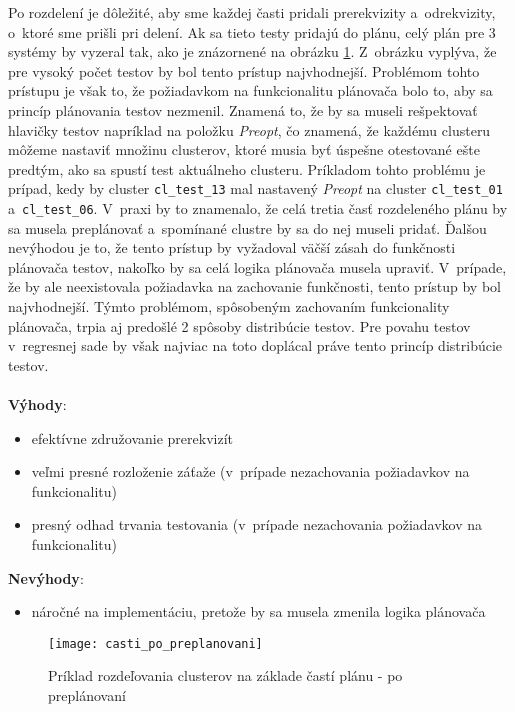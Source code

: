 Po rozdelení je dôležité, aby sme každej časti pridali prerekvizity 
a~odrekvizity, o~ktoré sme prišli pri delení. Ak sa tieto testy pridajú 
do plánu, celý plán pre 3 systémy by vyzeral tak, ako je znázornené na 
obrázku \ref{obrazok:distribucia_casti_po_preplanovani}.
Z~obrázku vyplýva, že pre vysoký počet testov by bol tento prístup 
najvhodnejší. Problémom tohto prístupu je však to, že požiadavkom na 
funkcionalitu plánovača bolo to, aby sa princíp plánovania testov nezmenil. 
Znamená to, že by sa museli rešpektovať hlavičky testov napríklad na 
položku \emph{Preopt}, čo znamená, že každému clusteru môžeme nastaviť 
množinu clusterov, ktoré musia byť úspešne otestované ešte predtým, 
ako sa spustí test aktuálneho clusteru.
Príkladom tohto problému je prípad, kedy by cluster \texttt{cl\_test\_13} 
mal nastavený \textit{Preopt} na cluster \texttt{cl\_test\_01} 
a~\texttt{cl\_test\_06}.
V~praxi by to znamenalo, že celá tretia časť rozdeleného plánu by sa 
musela preplánovať a~spomínané clustre by sa do nej museli pridať. 
Ďalšou nevýhodou je to, že tento prístup by vyžadoval väčší zásah do 
funkčnosti plánovača testov, nakoľko by sa celá logika plánovača musela upraviť.
V~prípade, že by ale neexistovala požiadavka na zachovanie funkčnosti, 
tento prístup by bol najvhodnejší. Týmto problémom, spôsobeným zachovaním 
funkcionality plánovača, trpia aj predošlé 2 spôsoby distribúcie testov. 
Pre povahu testov v~regresnej sade by však najviac na toto doplácal 
práve tento princíp distribúcie testov.  
\\
\\
\noindent \textbf{Výhody}:
\begin{itemize}
\item efektívne združovanie prerekvizít
\item veľmi presné rozloženie záťaže 
(v~prípade nezachovania požiadavkov na funkcionalitu)
\item presný odhad trvania testovania 
(v~prípade nezachovania požiadavkov na funkcionalitu)
\end{itemize} 

\noindent \textbf{Nevýhody}:
\begin{itemize}
\item náročné na implementáciu, pretože by sa musela zmenila logika plánovača
\end{itemize}

\begin{figure}[h]
  \begin{center}
    \texttt{[image: casti\_po\_preplanovani]}
    \caption{Príklad rozdeľovania clusterov na základe častí plánu
             - po preplánovaní}
    \label{obrazok:distribucia_casti_po_preplanovani}
  \end{center}
\end{figure}

